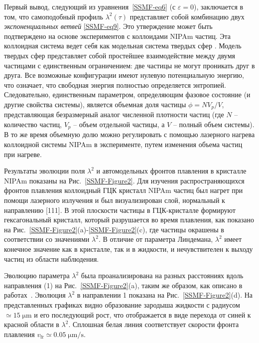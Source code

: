 Первый вывод, следующий из уравнения~\eqref{SSMF-eq6} (с $ \varepsilon = 0 $), заключается в том, что самоподобный профиль $\lambda^2(\tau) $ представляет собой комбинацию двух \emph{экспоненциальных ветвей} \eqref{SSMF-eq9}.
Это утверждение может быть подтверждено на основе экспериментов с коллоидами NIPAm частиц.
Эта коллоидная система ведет себя как модельная система твердых сфер \cite{10.1126/science.1224763, 10.1038/ncomms7942}.
Модель твердых сфер представляет собой простейшее взаимодействие между двумя частицами с единственным ограничением: две частицы не могут проникать друг в друга.
Все возможные конфигурации имеют нулевую потенциальную энергию, что означает, что свободная энергия полностью определяется энтропией.
Следовательно, единственным параметром, определяющим фазовое состояние (и другие свойства системы), является объемная доля частицы $ \phi = N V_p / V $, представляющая безразмерный аналог численной плотности частиц (где $ N $ -- количество частиц, $ V_p $ -- объем отдельной частицы, а $ V $ -- полный объем системы).
В то же время объемную долю можно регулировать с помощью лазерного нагрева коллоидной системы NIPAm в эксперименте, путем изменения объема частиц при нагреве.

Результаты эволюции поля $\lambda^2$ и автомодельных фронтов плавления в кристалле NIPAm показаны на Рис.~\ref{SSMF-Figure2}.
Для изучения распространяющихся фронтов плавления коллоидный ГЦК кристалл NIPAm частиц был нагрет при помощи лазерного излучения и был визуализирован слой, нормальный к направлению [111].
В этой плоскости частицы в ГЦК-кристалле формируют гексагональный кристалл, который разрушается во время плавления, как показано на Рис.~\ref{SSMF-Figure2}(a)-\ref{SSMF-Figure2}(c), где частицы окрашены в соответствии со значениями $ \lambda^2$.
В отличие от параметра Линдемана, $\lambda^2$ имеет конечное значение как в кристалле, так и в жидкости, и нечувствителен к выходу частиц из области наблюдения.

Эволюцию параметра $\lambda^2$ была проанализирована на разных расстояниях вдоль направления (1) на Рис.~\ref{SSMF-Figure2}(a), таким же образом, как описано в работах~\cite{10.1103/physreve.96.043201, 10.1103/physreve.100.023203}.
Эволюция $\lambda^2$ в направлении 1 показана на Рис.~\ref{SSMF-Figure2}(d).
На представленных графиках видно образование зародыша жидкости с радиусом $\simeq 15\;\mathrm{\mu m}$ и его последующий рост, что отображается в виде перехода от синей к красной области в $\lambda^2$.
Сплошная белая линия соответствует скорости фронта плавления $v_{\mathrm{fr}}\simeq 0.05 \;\mathrm{\mu m /s}$.

